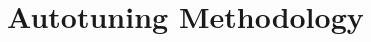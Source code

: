 \documentclass[times, 10pt,twocolumn]{article}
\begin{document}


\section{Autotuning Methodology}
\end{document}
